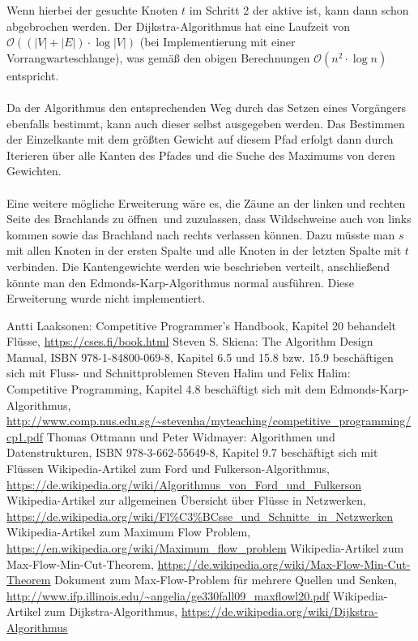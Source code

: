 \documentclass[a4paper, notitlepage, 12pt]{scrartcl}
\begin{document}
Wenn hierbei der gesuchte Knoten $t$ im Schritt 2 der aktive ist, kann dann schon abgebrochen werden.
Der Dijkstra-Algorithmus hat eine Laufzeit von $\mathcal{O}((|V|+|E|) \cdot \log |V|)$ (bei Implementierung mit einer Vorrangwarteschlange), was gemäß den obigen Berechnungen $\mathcal{O}(n^{2} \cdot \log n)$ entspricht. \\ \\ Da der Algorithmus den entsprechenden Weg durch das Setzen eines Vorgängers ebenfalls bestimmt, kann auch dieser selbst ausgegeben werden. Das Bestimmen der Einzelkante mit dem größten Gewicht auf diesem Pfad erfolgt dann durch Iterieren über alle Kanten des Pfades und die Suche des Maximums von deren Gewichten. \\ \\
Eine weitere mögliche Erweiterung wäre es, die Zäune an der linken und rechten Seite des Brachlands zu \glqq öffnen\grqq ~und zuzulassen, dass Wildschweine auch von links kommen sowie das Brachland nach rechts verlassen können. Dazu müsste man $s$ mit allen Knoten in der ersten Spalte und alle Knoten in der letzten Spalte mit $t$ verbinden. Die Kantengewichte werden wie beschrieben verteilt, anschließend könnte man den Edmonds-Karp-Algorithmus normal ausführen. Diese Erweiterung wurde nicht implementiert.
\begin{thebibliography}{xx}
 Antti Laaksonen: Competitive Programmer’s Handbook, Kapitel 20 behandelt Flüsse, \url{https://cses.fi/book.html} 
 Steven S. Skiena: The Algorithm Design Manual, ISBN 978-1-84800-069-8, Kapitel 6.5 und 15.8 bzw. 15.9 beschäftigen sich mit Fluss- und Schnittproblemen
 Steven Halim und Felix Halim: Competitive Programming, Kapitel 4.8 beschäftigt sich mit dem Edmonds-Karp-Algorithmus, \url{http://www.comp.nus.edu.sg/~stevenha/myteaching/competitive_programming/cp1.pdf}
 Thomas Ottmann und Peter Widmayer: Algorithmen und Datenstrukturen, ISBN 978-3-662-55649-8, Kapitel 9.7 beschäftigt sich mit Flüssen
 Wikipedia-Artikel zum Ford und Fulkerson-Algorithmus, \url{https://de.wikipedia.org/wiki/Algorithmus_von_Ford_und_Fulkerson}
 Wikipedia-Artikel zur allgemeinen Übersicht über Flüsse in Netzwerken, \url{https://de.wikipedia.org/wiki/Fl\%C3\%BCsse_und_Schnitte_in_Netzwerken}
 Wikipedia-Artikel zum Maximum Flow Problem, \url{https://en.wikipedia.org/wiki/Maximum_flow_problem}
 Wikipedia-Artikel zum Max-Flow-Min-Cut-Theorem, \url{https://de.wikipedia.org/wiki/Max-Flow-Min-Cut-Theorem}
 Dokument zum Max-Flow-Problem für mehrere Quellen und Senken, \url{http://www.ifp.illinois.edu/~angelia/ge330fall09_maxflowl20.pdf}
 Wikipedia-Artikel zum Dijkstra-Algorithmus, \url{https://de.wikipedia.org/wiki/Dijkstra-Algorithmus}
\end{thebibliography}
\end{document}
